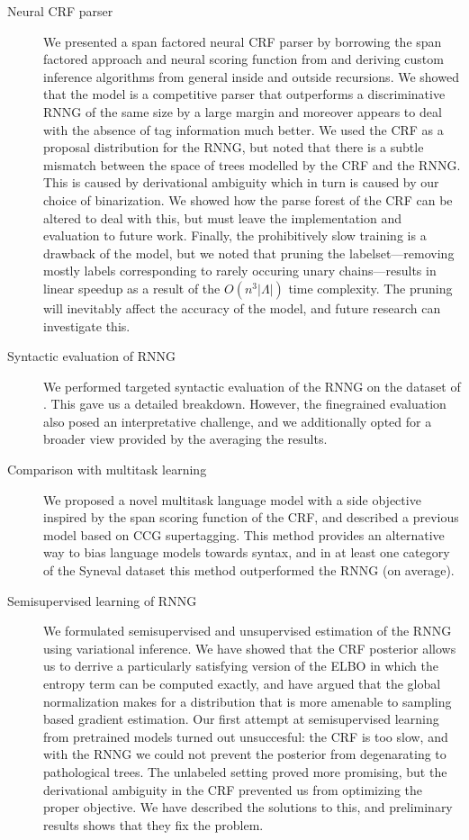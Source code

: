   \begin{description}
    \item[Neural CRF parser]
      We presented a span factored neural CRF parser by borrowing the span factored approach and neural scoring function from \cite{stern2017minimal} and deriving custom inference algorithms from general inside and outside recursions. We showed that the model is a competitive parser that outperforms a discriminative RNNG of the same size by a large margin and moreover appears to deal with the absence of tag information much better. We used the CRF as a proposal distribution for the RNNG, but noted that there is a subtle mismatch between the space of trees modelled by the CRF and the RNNG. This is caused by derivational ambiguity which in turn is caused by our choice of binarization. We showed how the parse forest of the CRF can be altered to deal with this, but must leave the implementation and evaluation to future work. Finally, the prohibitively slow training is a drawback of the model, but we noted that pruning the labelset---removing mostly labels corresponding to rarely occuring unary chains---results in linear speedup as a result of the $O(n^3 \lvert \Lambda \rvert)$ time complexity. The pruning will inevitably affect the accuracy of the model, and future research can investigate this.

    \item[Syntactic evaluation of RNNG]
      We performed targeted syntactic evaluation of the RNNG on the dataset of \citet{linzen2018targeted}. This gave us a detailed breakdown. However, the finegrained evaluation also posed an interpretative challenge, and we additionally opted for a broader view provided by the averaging the results.

    \item[Comparison with multitask learning]
      We proposed a novel multitask language model with a side objective inspired by the span scoring function of the CRF, and described a previous model based on CCG supertagging. This method provides an alternative way to bias language models towards syntax, and in at least one category of the Syneval dataset this method outperformed the RNNG (on average).

    \item[Semisupervised learning of RNNG]
      We formulated semisupervised and unsupervised estimation of the RNNG using variational inference. We have showed that the CRF posterior allows us to derrive a particularly satisfying version of the ELBO in which the entropy term can be computed exactly, and have argued that the global normalization makes for a distribution that is more amenable to sampling based gradient estimation. Our first attempt at semisupervised learning from pretrained models turned out unsuccesful: the CRF is too slow, and with the RNNG we could not prevent the posterior from degenarating to pathological trees. The unlabeled setting proved more promising, but the derivational ambiguity in the CRF prevented us from optimizing the proper objective. We have described the solutions to this, and preliminary results shows that they fix the problem.

  \end{description}

